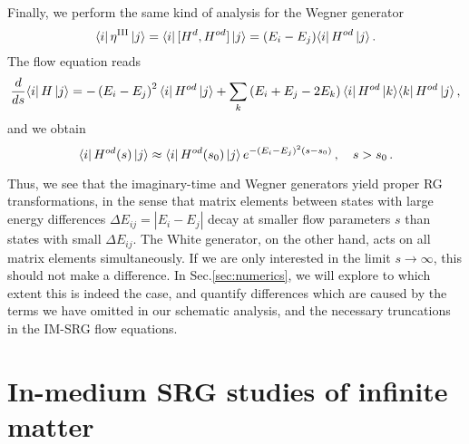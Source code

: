Finally, we perform the same kind of analysis for the Wegner generator
\begin{equation}
  \langle{i}|\,{\eta^\text{III}}\,|{j}\rangle=\langle{i}|\,{[{H^d},{H^{od}}]}\,|{j}\rangle=(E_i-E_j)\langle{i}|\,{H^{od}}\,|{j}\rangle\,.
\end{equation}
The flow equation reads
\begin{align}
  \totd{}{s}\matrixe{i}{\HO}{j}
  =-\left(E_i-E_j\right)^2\matrixe{i}{\HO^{od}}{j}
  +\sum_k\left(E_i+E_j-2E_k\right)\matrixe{i}{\HO^{od}}{k}\matrixe{k}{\HO^{od}}{j}\,,\label{eq:schema_wegner}
\end{align}
and we obtain
\begin{equation}
  \langle{i}|\,{H^{od}(s)}\,|{j}\rangle \approx \langle{i}|\,{H^{od}(s_0)}\,|{j}\rangle\,e^{-(E_i-E_j)^2 (s-s_0)}\,, \quad s>s_0\,.
\end{equation}

Thus, we see that the imaginary-time and Wegner generators yield proper RG transformations, in the sense that matrix elements between states with large energy differences $\Delta E_{ij} = |E_i-E_j|$ decay at smaller flow parameters $s$ than states with small $\Delta E_{ij}$. The White generator, on the other hand, acts on all matrix elements simultaneously. If we are only interested in the limit $s\to\infty$, this should not make a difference. In Sec.\ref{sec:numerics}, we will explore to which extent this is indeed the case, and quantify differences which are caused by the terms we have omitted in our schematic analysis, and the necessary truncations in the IM-SRG flow equations.  


\section{In-medium SRG studies of infinite matter}

\begin{acknowledgement}

\end{acknowledgement}








 
